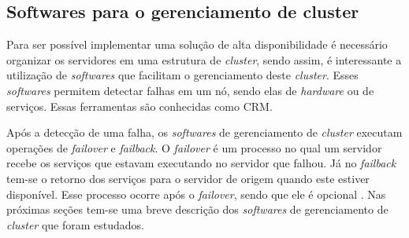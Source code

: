 


\subsection{Softwares para o gerenciamento de cluster}
\label{section:toolcluster}

Para ser possível implementar uma solução de alta disponibilidade é necessário organizar os servidores em uma estrutura de \textit{cluster},
sendo assim, é interessante a utilização de \textit{softwares} que facilitam o gerenciamento deste \textit{cluster}. Esses \textit{softwares} 
permitem detectar falhas em um nó, sendo elas de \textit{hardware} ou de serviços. Essas ferramentas são conhecidas como \ac{CRM}. 

Após a detecção de uma falha, os \textit{softwares} de gerenciamento de \textit{cluster} executam operações de \textit{failover} e 
\textit{failback}. O \textit{failover} é um processo no qual um servidor recebe os serviços que estavam executando no servidor que falhou. 
Já no \textit{failback} tem-se o retorno dos serviços para o servidor de origem quando este estiver disponível. Esse processo ocorre após o 
\textit{failover}, sendo que ele é opcional \cite{bassan2008}. Nas próximas seções tem-se uma breve descrição dos \textit{softwares} de 
gerenciamento de \textit{cluster} que foram estudados.


